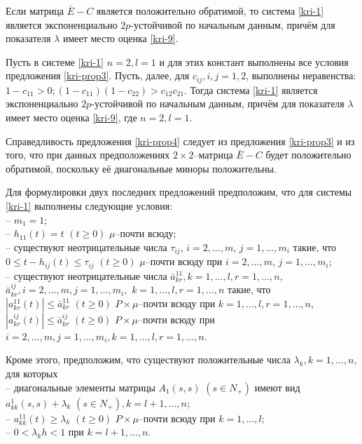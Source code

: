 \begin{proposition}\label{kri-prop3}
Если матрица $\bar E - C$ является
положительно обратимой, то система \eqref{kri-1} является экспоненциально
${2p}$-устойчивой по начальным данным, причём для показателя
$\lambda$ имеет место оценка \eqref{kri-9}.
\end{proposition}

\begin{proposition}\label{kri-prop4}
Пусть в системе \eqref{kri-1} $n = 2, l = 1$ и для этих констант выполнены все условия предложения \ref{kri-prop3}. Пусть, далее, для $c_{ij}, i,j = 1, 2$, выполнены неравенства: $ 1 - c_{11} > 0; (1 - c_{11})(1 - c_{22}) > c_{12}c_{21}$. Тогда система \eqref{kri-1}
является экспоненциально ${2p}$-устойчивой по начальным данным,
причём для показателя  $\lambda$ имеет место оценка \eqref{kri-9}, где $n = 2,
l = 1$.
\end{proposition}
Справедливость предложения \ref{kri-prop4} следует из предложения \ref{kri-prop3} и из того, что
при данных предположениях $2\times 2$--матрица $\bar E - C$ будет
положительно обратимой, поскольку её диагональные миноры
положительны.

Для формулировки двух последних предложений предположим, что для
системы \eqref{kri-1} выполнены следующие условия:\\
\noindent
  -- $m_1 =1$;\\
  -- $h_{11}(t) = t \,\, (t \geq 0)$ $\mu $--почти всюду;\\
  -- существуют неотрицательные числа $\tau_{ij}$, $i =
2,\dots,m$, $j = 1,\dots,m_i$  такие, что
 $0 \leq t- h_{ij}(t)
\leq \tau _{ij} {\,} {\,} (t \geq 0)$ $\mu $--почти всюду при $i =
2,\dots,m$, $j = 1,\dots,m_i$;\\
-- существуют неотрицательные числа
  $\bar a^{11}_{kr},  k =1,\dots,l, r =
1,\dots,n$, $\bar a^{ij}_{kr}, i = 2,\dots,m, j = 1,\dots,m_i,$ $k =1,\dots,l,
r = 1,\dots,n$  такие, что $|a^{11}_{kr}(t)|\leq \bar a^{11}_{kr} \,\,
(t\geq 0) $ $P\times\mu$--почти всюду при $k =1,\dots,l, r = 1,\dots,n$,
$|a^{ij}_{kr}(t)|\leq \bar a^{ij}_{kr} \,\, (t\geq 0) $
$P\times\mu$--почти всюду при $i = 2, \dots, m, j = 1,\dots,m_i, k
=1,\dots,l, r = 1,\dots,n$.

Кроме этого, предположим, что существуют положительные числа
$\lambda _k, k = 1, \dots, n$, для которых\\
\noindent
  -- диагональные элементы
матрицы $ A_1(s,s)$ $(s \in N_+)$ имеют вид $a_{kk}^{1}(s,s) +
\lambda _k \,\, (s \in N_+), k=l + 1, \dots, n$;\\
-- $a^{11}_{kk}(t)  \geq
\lambda _k \,\, (t\geq 0)$ $P\times\mu$--почти всюду при $k =
1,\dots,l$;\\
 -- $0 < \lambda _kh < 1$ при $ k = l + 1, \dots, n$.

